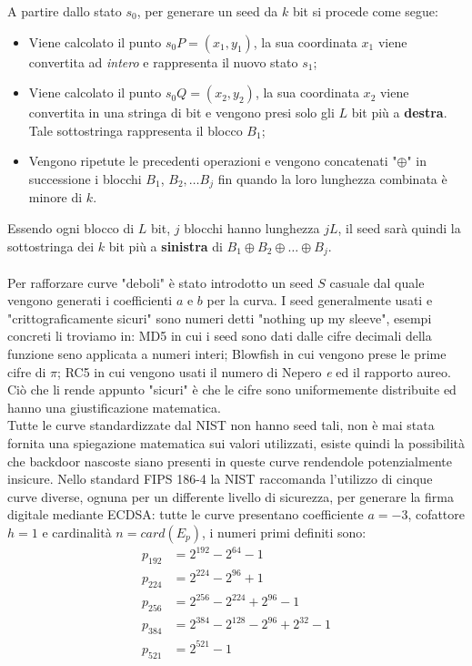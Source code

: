 \documentclass[a4paper,12pt]{tesiinfo}
\begin{document}
A partire dallo stato $s_0$, per generare un seed da $k$ bit si procede come segue: 
\begin{itemize}
    \item Viene calcolato il punto $s_0P = (x_1, y_1)$, la sua coordinata $x_1$ viene convertita ad \textit{intero} e rappresenta il nuovo stato $s_1$;
    \item Viene calcolato il punto $s_0Q = (x_2, y_2)$, la sua coordinata $x_2$ viene convertita in una stringa di bit e vengono presi solo gli $L$ bit pi\`u a \textbf{destra}. Tale sottostringa rappresenta il blocco $B_1$;
    \item Vengono ripetute le precedenti operazioni e vengono concatenati "$\oplus$" in successione i blocchi $B_1$, $B_2, \ldots B_j$ fin quando la loro lunghezza combinata \`e minore di $k$. 
\end{itemize}
Essendo ogni blocco di $L$ bit, $j$ blocchi hanno lunghezza $jL$, il seed sar\`a quindi la sottostringa dei $k$ bit pi\`u a \textbf{sinistra} di $B_1 \oplus B_2 \oplus \ldots \oplus B_j$.
\\
\\
Per rafforzare curve "deboli" \`e stato introdotto un seed $S$ casuale dal quale vengono generati i coefficienti $a$ e $b$ per la curva. I seed generalmente usati e "crittograficamente sicuri" sono numeri detti "nothing up my sleeve", esempi concreti li troviamo in: MD5 in cui i seed sono dati dalle cifre decimali della funzione seno applicata a numeri interi; Blowfish in cui vengono prese le prime cifre di $\pi$; RC5 in cui vengono usati il numero di Nepero \textit{e} ed il rapporto aureo. Ci\`o che li rende appunto "sicuri" \`e che le cifre sono uniformemente distribuite ed hanno una giustificazione matematica. 
\\
Tutte le curve standardizzate dal NIST non hanno seed tali, non \`e mai stata fornita una spiegazione matematica sui valori utilizzati, esiste quindi la possibilit\`a che backdoor nascoste siano presenti in queste curve rendendole potenzialmente insicure. Nello standard FIPS 186-4 la NIST raccomanda l'utilizzo di cinque curve diverse, ognuna per un differente livello di sicurezza, per generare la firma digitale mediante ECDSA: tutte le curve presentano coefficiente $a=-3$, cofattore $h=1$ e cardinalit\`a $n=card(E_p)$, i numeri primi definiti sono:
\begin{align*}
    p_{192} &= 2^{192} - 2^{64}-1\\
    p_{224} &= 2^{224} - 2^{96}+1\\
    p_{256} &= 2^{256} - 2^{224}+ 2^{96}-1\\
    p_{384} &= 2^{384} - 2^{128}-2^{96}+2^{32}-1\\
    p_{521} &= 2^{521} -1
\end{align*}
\end{document}
